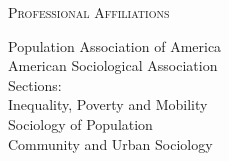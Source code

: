 \documentclass[10pt, letterpaper]{article}
\newenvironment{sectionbody}
  {\begin{list}{}{\setlength{\leftmargin}{50pt}\setlength{\topsep}{2pt}\setlength{\partopsep}{0pt}}\item[]}
  {\end{list}}
\newcommand{\sectionheading}[1]{%
  \vspace{0.5em}
  \noindent
  \makebox[0pt][l]{\rule[-.5\baselineskip]{\linewidth}{.1mm}}%
  \textsc{#1}\par\nobreak
  \vspace{0.4em}
}
\begin{document}
\sectionheading{Professional Affiliations}
\begin{sectionbody}
Population Association of America \\
American Sociological Association \\
Sections: \\
\hspace*{10mm} Inequality, Poverty and Mobility \\
\hspace*{10mm} Sociology of Population \\
\hspace*{10mm} Community and Urban Sociology
\end{sectionbody}

\end{document}
